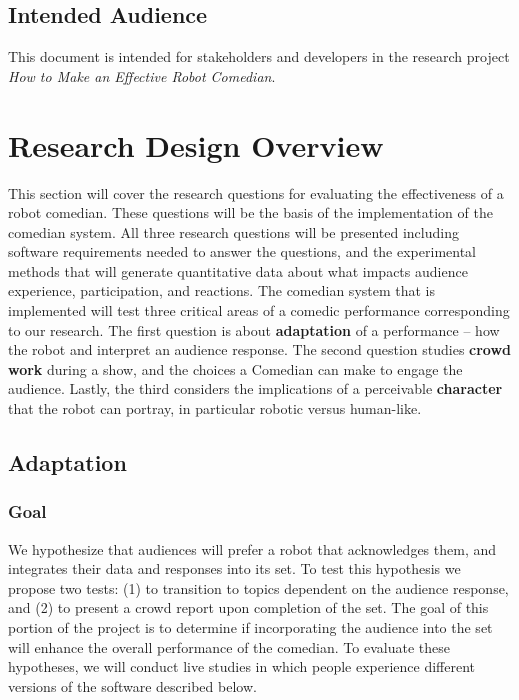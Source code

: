 \subsection{Intended Audience}
	This document is intended for stakeholders and developers in the research project \textit{How to Make an Effective Robot Comedian}.


\section{Research Design Overview}
This section will cover the research questions for evaluating the effectiveness of a robot comedian. These questions will
be the basis of the implementation of the comedian system. All three research questions will be presented including
software requirements needed to answer the questions, and the experimental methods that will generate quantitative
data about what impacts audience experience, participation, and reactions.
The comedian system that is implemented will test three critical areas of a comedic performance corresponding
to our research. The first question is about \textbf{adaptation} of a performance – how the robot and interpret an audience
response. The second question studies \textbf{crowd work} during a show, and the choices a Comedian can make to engage the
audience. Lastly, the third considers the implications of a perceivable \textbf{character} that the robot can portray, in particular robotic versus human-like.


\subsection{Adaptation}
\subsubsection{Goal}
We hypothesize that audiences will prefer a robot that acknowledges them, and integrates their data and responses into
its set. To test this hypothesis we propose two tests: (1) to transition to topics dependent on the audience response,
and (2) to present a crowd report upon completion of the set. The goal of this portion of the project is to determine
if incorporating the audience into the set will enhance the overall performance of the comedian. To evaluate these
hypotheses, we will conduct live studies in which people experience different versions of the software described below.
